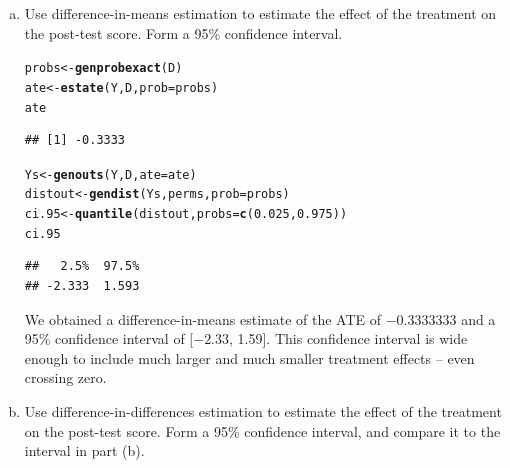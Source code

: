 \documentclass[11pt,notitlepage]{article}\usepackage[]{graphicx}\usepackage[]{color}
\makeatletter
\newcommand{\hlnum}[1]{\textcolor[rgb]{0.686,0.059,0.569}{#1}}%
\newcommand{\hlstd}[1]{\textcolor[rgb]{0.345,0.345,0.345}{#1}}%
\newcommand{\hlkwb}[1]{\textcolor[rgb]{0.69,0.353,0.396}{#1}}%
\newcommand{\hlkwc}[1]{\textcolor[rgb]{0.333,0.667,0.333}{#1}}%
\newcommand{\hlkwd}[1]{\textcolor[rgb]{0.737,0.353,0.396}{\textbf{#1}}}%
\newenvironment{kframe}{%
 \def\at@end@of@kframe{}%
 \ifinner\ifhmode%
  \def\at@end@of@kframe{\end{minipage}}%
  \begin{minipage}{\columnwidth}%
 \fi\fi%
 \def\FrameCommand##1{\hskip\@totalleftmargin \hskip-\fboxsep
 \colorbox{shadecolor}{##1}\hskip-\fboxsep
     \hskip-\linewidth \hskip-\@totalleftmargin \hskip\columnwidth}%
 \MakeFramed {\advance\hsize-\width
   \@totalleftmargin\z@ \linewidth\hsize
   \@setminipage}}%
 {\par\unskip\endMakeFramed%
 \at@end@of@kframe}
\newenvironment{knitrout}{}{} %
\makeatother
\begin{document}
\begin{enumerate}[a)]
\item Use difference-in-means estimation to estimate the effect of the treatment on the post-test score.  Form a 95\% confidence interval.\\

\begin{knitrout}
\color{fgcolor}\begin{kframe}
\begin{alltt}
\hlstd{probs} \hlkwb{<-} \hlkwd{genprobexact}\hlstd{(D)}
\hlstd{ate} \hlkwb{<-} \hlkwd{estate}\hlstd{(Y,D,}\hlkwc{prob}\hlstd{=probs)}
\hlstd{ate}
\end{alltt}
\begin{verbatim}
## [1] -0.3333
\end{verbatim}
\begin{alltt}
\hlstd{Ys} \hlkwb{<-} \hlkwd{genouts}\hlstd{(Y,D,}\hlkwc{ate}\hlstd{=ate)}
\hlstd{distout} \hlkwb{<-} \hlkwd{gendist}\hlstd{(Ys,perms,}\hlkwc{prob}\hlstd{=probs)}
\hlstd{ci.95} \hlkwb{<-} \hlkwd{quantile}\hlstd{(distout,}\hlkwc{probs}\hlstd{=}\hlkwd{c}\hlstd{(}\hlnum{0.025}\hlstd{,} \hlnum{0.975}\hlstd{))}
\hlstd{ci.95}
\end{alltt}
\begin{verbatim}
##   2.5%  97.5% 
## -2.333  1.593
\end{verbatim}
\end{kframe}
\end{knitrout}

We obtained a difference-in-means estimate of the ATE of \ensuremath{-0.3333333} and a 95\% confidence interval of [\ensuremath{-2.33}, 1.59]. This confidence interval is wide enough to include much larger and much smaller treatment effects -- even crossing zero.

\item Use difference-in-differences estimation to estimate the effect of the treatment on the post-test score. Form a 95\% confidence interval, and compare it to the interval in part (b).


\end{enumerate}
\end{document}
